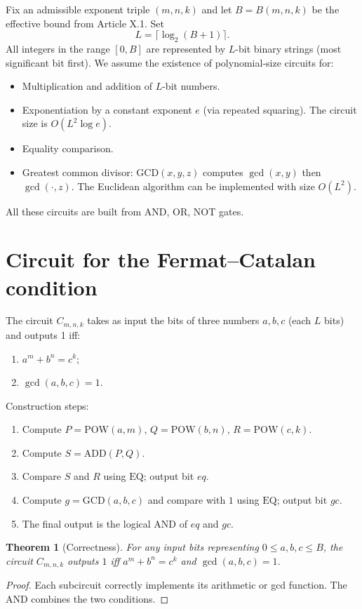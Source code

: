 \documentclass[11pt,a4paper]{article}
\newtheorem{theorem}{Theorem}[section]
\begin{document}
Fix an admissible exponent triple \((m,n,k)\) and let \(B = B(m,n,k)\) be the effective bound from Article X.1. Set
\[
L = \lceil \log_2(B+1)\rceil.
\]
All integers in the range \([0,B]\) are represented by \(L\)-bit binary strings (most significant bit first). We assume the existence of polynomial‑size circuits for:
\begin{itemize}
\item Multiplication and addition of \(L\)-bit numbers.
\item Exponentiation by a constant exponent \(e\) (via repeated squaring). The circuit size is \(O(L^2 \log e)\).
\item Equality comparison.
\item Greatest common divisor: \(\mathrm{GCD}(x,y,z)\) computes \(\gcd(x,y)\) then \(\gcd(\cdot,z)\). The Euclidean algorithm can be implemented with size \(O(L^2)\).
\end{itemize}
All these circuits are built from AND, OR, NOT gates.

\section{Circuit for the Fermat–Catalan condition}

The circuit \(C_{m,n,k}\) takes as input the bits of three numbers \(a,b,c\) (each \(L\) bits) and outputs 1 iff:
\begin{enumerate}
\item \(a^m + b^n = c^k\);
\item \(\gcd(a,b,c)=1\).
\end{enumerate}

Construction steps:
\begin{enumerate}
\item Compute \(P = \mathrm{POW}(a,m)\), \(Q = \mathrm{POW}(b,n)\), \(R = \mathrm{POW}(c,k)\).
\item Compute \(S = \mathrm{ADD}(P, Q)\).
\item Compare \(S\) and \(R\) using \(\mathrm{EQ}\); output bit \(eq\).
\item Compute \(g = \mathrm{GCD}(a,b,c)\) and compare with \(1\) using \(\mathrm{EQ}\); output bit \(gc\).
\item The final output is the logical AND of \(eq\) and \(gc\).
\end{enumerate}

\begin{theorem}[Correctness]
\label{thm:correct}
For any input bits representing \(0\le a,b,c \le B\), the circuit \(C_{m,n,k}\) outputs \(1\) iff \(a^m + b^n = c^k\) and \(\gcd(a,b,c)=1\).
\end{theorem}
\begin{proof}
Each subcircuit correctly implements its arithmetic or gcd function. The AND combines the two conditions.
\end{proof}
\end{document}
